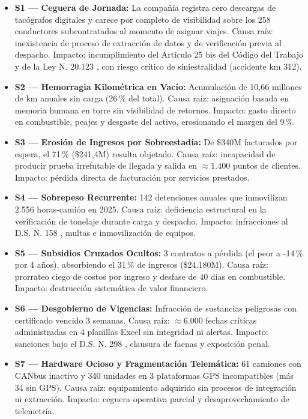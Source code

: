\begin{itemize}
    \item \textbf{S1 --- Ceguera de Jornada:} La compañía registra cero descargas de tacógrafos digitales y carece por completo de visibilidad sobre los 258 conductores subcontratados al momento de asignar viajes. Causa raíz: inexistencia de proceso de extracción de datos y de verificación previa al despacho. Impacto: incumplimiento del Artículo 25 bis del Código del Trabajo \parencite{codigo_trabajo_25bis} y de la Ley N.\textordmasculine{} 20.123 \parencite{ley20123}, con riesgo crítico de siniestralidad (accidente km 312).
    \item \textbf{S2 --- Hemorragia Kilométrica en Vacío:} Acumulación de 10,66 millones de km anuales sin carga (26\,\% del total). Causa raíz: asignación basada en memoria humana en torre sin visibilidad de retornos. Impacto: gasto directo en combustible, peajes y desgaste del activo, erosionando el margen del 9\,\%.
    \item \textbf{S3 --- Erosión de Ingresos por Sobreestadía:} De \$340M facturados por espera, el 71\,\% (\$241,4M) resulta objetado. Causa raíz: incapacidad de producir prueba irrefutable de llegada y salida en $\approx 1.400$ puntos de clientes. Impacto: pérdida directa de facturación por servicios prestados.
    \item \textbf{S4 --- Sobrepeso Recurrente:} 142 detenciones anuales que inmovilizan 2.556 horas-camión en 2025. Causa raíz: deficiencia estructural en la verificación de tonelaje durante carga y despacho. Impacto: infracciones al D.S. N.\textordmasculine{} 158 \parencite{ds158}, multas e inmovilización de equipos.
    \item \textbf{S5 --- Subsidios Cruzados Ocultos:} 3 contratos a pérdida (el peor a -14\,\% por 4 años), absorbiendo el 31\,\% de ingresos (\$24.180M). Causa raíz: prorrateo ciego de costos por ingreso y desfase de 40 días en combustible. Impacto: destrucción sistemática de valor financiero.
    \item \textbf{S6 --- Desgobierno de Vigencias:} Infracción de sustancias peligrosas con certificado vencido 3 semanas. Causa raíz: $\approx 6.000$ fechas críticas administradas en 4 planillas Excel sin integridad ni alertas. Impacto: sanciones bajo el D.S. N.\textordmasculine{} 298 \parencite{ds298}, clausura de faenas y exposición penal.
    \item \textbf{S7 --- Hardware Ocioso y Fragmentación Telemática:} 61 camiones con CANbus inactivo y 340 unidades en 3 plataformas GPS incompatibles (más 34 sin GPS). Causa raíz: equipamiento adquirido sin procesos de integración ni extracción. Impacto: ceguera operativa parcial y desaprovechamiento de telemetría.

\end{itemize}
